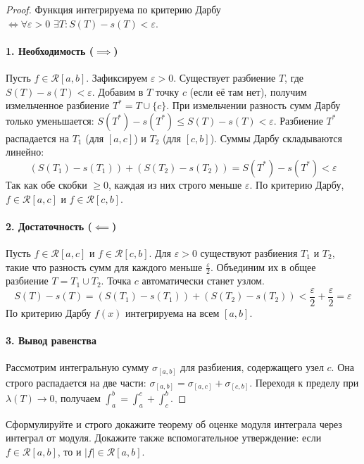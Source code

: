 \begin{proof}
Функция интегрируема по критерию Дарбу $\iff \forall \varepsilon > 0 \,\, \exists T: S(T) - s(T) < \varepsilon$.

\paragraph{1. Необходимость ($\implies$)} 
Пусть $f \in \mathcal{R}[a, b]$. Зафиксируем $\varepsilon > 0$. Существует разбиение $T$, где $S(T) - s(T) < \varepsilon$.
Добавим в $T$ точку $c$ (если её там нет), получим измельченное разбиение $T^* = T \cup \{c\}$. При измельчении разность сумм Дарбу только уменьшается: $S(T^*) - s(T^*) \le S(T) - s(T) < \varepsilon$.
Разбиение $T^*$ распадается на $T_1$ (для $[a, c]$) и $T_2$ (для $[c, b]$). Суммы Дарбу складываются линейно:
$$ (S(T_1) - s(T_1)) + (S(T_2) - s(T_2)) = S(T^*) - s(T^*) < \varepsilon $$
Так как обе скобки $\ge 0$, каждая из них строго меньше $\varepsilon$. По критерию Дарбу, $f \in \mathcal{R}[a, c]$ и $f \in \mathcal{R}[c, b]$.

\paragraph{2. Достаточность ($\impliedby$)}
Пусть $f \in \mathcal{R}[a, c]$ и $f \in \mathcal{R}[c, b]$. Для $\varepsilon > 0$ существуют разбиения $T_1$ и $T_2$, такие что разность сумм для каждого меньше $\frac{\varepsilon}{2}$.
Объединим их в общее разбиение $T = T_1 \cup T_2$. Точка $c$ автоматически станет узлом.
$$ S(T) - s(T) = (S(T_1) - s(T_1)) + (S(T_2) - s(T_2)) < \frac{\varepsilon}{2} + \frac{\varepsilon}{2} = \varepsilon $$
По критерию Дарбу $f(x)$ интегрируема на всем $[a, b]$.

\paragraph{3. Вывод равенства}
Рассмотрим интегральную сумму $\sigma_{[a,b]}$ для разбиения, содержащего узел $c$. Она строго распадается на две части: $\sigma_{[a,b]} = \sigma_{[a,c]} + \sigma_{[c,b]}$. Переходя к пределу при $\lambda(T) \to 0$, получаем $\int_a^b = \int_a^c + \int_c^b$.
\end{proof}


{Сформулируйте и строго докажите теорему об оценке модуля интеграла через интеграл от модуля. Докажите также вспомогательное утверждение: если $f\in\mathcal{R}[a,b]$, то и $|f|\in\mathcal{R}[a,b]$.}

